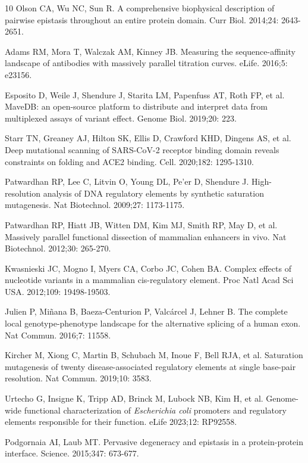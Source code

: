 \documentclass[10pt,letterpaper]{article}
\begin{document}
\begin{thebibliography}{10}
 Olson CA, Wu NC, Sun R. A comprehensive biophysical description of pairwise epistasis throughout an entire protein domain. Curr Biol. 2014;24: 2643-2651. 

 Adams RM, Mora T, Walczak AM, Kinney JB. Measuring the sequence-affinity landscape of antibodies with massively parallel titration curves. eLife. 2016;5: e23156. 

 Esposito D, Weile J, Shendure J, Starita LM, Papenfuss AT, Roth FP, et al. MaveDB: an open-source platform to distribute and interpret data from multiplexed assays of variant effect. Genome Biol. 2019;20: 223. 

 Starr TN, Greaney AJ, Hilton SK, Ellis D, Crawford KHD, Dingens AS, et al. Deep mutational scanning of SARS-CoV-2 receptor binding domain reveals constraints on folding and ACE2 binding. Cell. 2020;182: 1295-1310.

 Patwardhan RP, Lee C, Litvin O, Young DL, Pe'er D, Shendure J. High-resolution analysis of DNA regulatory elements by synthetic saturation mutagenesis. Nat Biotechnol. 2009;27: 1173-1175.

 Patwardhan RP, Hiatt JB, Witten DM, Kim MJ, Smith RP, May D, et al. Massively parallel functional dissection of mammalian enhancers in vivo. Nat Biotechnol. 2012;30: 265-270. 

 Kwasnieski JC, Mogno I, Myers CA, Corbo JC, Cohen BA. Complex effects of nucleotide variants in a mammalian cis-regulatory element. Proc Natl Acad Sci USA. 2012;109: 19498-19503. 

 Julien P, Mi\~{n}ana B, Baeza-Centurion P, Valc\'{a}rcel J, Lehner B. The complete local genotype-phenotype landscape for the alternative splicing of a human exon. Nat Commun. 2016;7: 11558. 

 Kircher M, Xiong C, Martin B, Schubach M, Inoue F, Bell RJA, et al. Saturation mutagenesis of twenty disease-associated regulatory elements at single base-pair resolution. Nat Commun. 2019;10: 3583. 

 Urtecho G, Insigne K, Tripp AD, Brinck M, Lubock NB, Kim H, et al. Genome-wide functional characterization of \textit{Escherichia coli} promoters and regulatory elements responsible for their function. eLife 2023;12: RP92558.

 Podgornaia AI, Laub MT. Pervasive degeneracy and epistasis in a protein-protein interface. Science. 2015;347: 673-677. 


\end{thebibliography}
\end{document}

